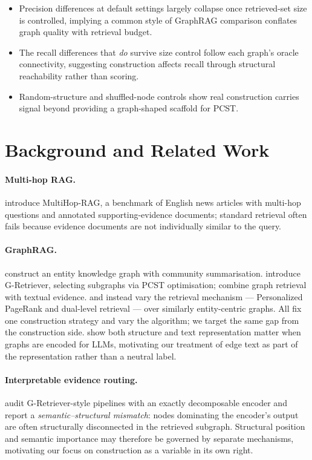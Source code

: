 \documentclass[11pt]{article}
\begin{document}
\begin{itemize}\itemsep0pt\parskip0pt
  \item Precision differences at default settings largely collapse once retrieved-set size is controlled, implying a common style of GraphRAG comparison conflates graph quality with retrieval budget.
  \item The recall differences that \textit{do} survive size control follow each graph's oracle connectivity, suggesting construction affects recall through structural reachability rather than scoring.
  \item Random-structure and shuffled-node controls show real construction carries signal beyond providing a graph-shaped scaffold for PCST.
\end{itemize}

\section{Background and Related Work}

\paragraph{Multi-hop RAG.} \citet{tang2024multihoprag} introduce MultiHop-RAG, a benchmark of English news articles with multi-hop questions and annotated supporting-evidence documents; standard retrieval often fails because evidence documents are not individually similar to the query.

\paragraph{GraphRAG.} \citet{edge2024graphrag} construct an entity knowledge graph with community summarisation. \citet{he2024gretriever} introduce G-Retriever, selecting subgraphs via PCST optimisation; \citet{hu2025grag} combine graph retrieval with textual evidence. \citet{gutierrez2024hipporag} and \citet{guo2024lightrag} instead vary the retrieval mechanism --- Personalized PageRank and dual-level retrieval --- over similarly entity-centric graphs. All fix one construction strategy and vary the algorithm; we target the same gap from the construction side. \citet{fatemi2024talkgraph} show both structure and text representation matter when graphs are encoded for LLMs, motivating our treatment of edge text as part of the representation rather than a neutral label.

\paragraph{Interpretable evidence routing.} \citet{sade2026exgraphrag} audit G-Retriever-style pipelines with an exactly decomposable encoder and report a \textit{semantic--structural mismatch}: nodes dominating the encoder's output are often structurally disconnected in the retrieved subgraph. Structural position and semantic importance may therefore be governed by separate mechanisms, motivating our focus on construction as a variable in its own right.
\end{document}
